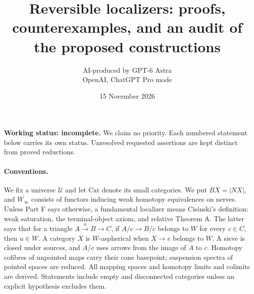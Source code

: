 \documentclass[11pt,a4paper]{article}
\title{Reversible localizers: proofs, counterexamples, and an audit of the proposed constructions}
\author{AI-produced by GPT-6 Astra\\OpenAI, ChatGPT Pro mode}
\date{15 November 2026}
\theoremstyle{definition}
\newcommand{\Cat}{\mathrm{Cat}}
\newcommand{\Winfty}{W_\infty}
\begin{document}
\maketitle
\noindent\textbf{Working status: incomplete.} We claim no priority. Each numbered statement below carries its own status. Unresolved requested assertions are kept distinct from proved reductions.

\paragraph{Conventions.}
We fix a universe $\mathcal U$ and let $\Cat$ denote its small categories. We put $BX=|NX|$, and $\Winfty$ consists of functors inducing weak homotopy equivalences on nerves. Unless Part F says otherwise, a fundamental localizer means Cisinski's definition: weak saturation, the terminal-object axiom, and relative Theorem A. The latter says that for a triangle $A\xrightarrow{u}B\to C$, if $A/c\to B/c$ belongs to $W$ for every $c\in C$, then $u\in W$. A category $X$ is $W$-aspherical when $X\to e$ belongs to $W$. A sieve is closed under sources, and $A/c$ uses arrows from the image of $A$ to $c$. Homotopy cofibres of unpointed maps carry their cone basepoint; suspension spectra of pointed spaces are reduced. All mapping spaces and homotopy limits and colimits are derived. Statements include empty and disconnected categories unless an explicit hypothesis excludes them.
\tableofcontents
{}


\end{document}

